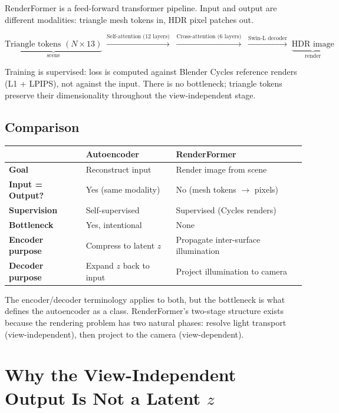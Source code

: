 \documentclass[12pt]{article}
\begin{document}
RenderFormer is a feed-forward transformer pipeline. Input and output are different modalities: triangle mesh tokens in, HDR pixel patches out.

\begin{equation}
    \underbrace{\text{Triangle tokens } (N \times 13)}_{\text{scene}} \;\xrightarrow{\text{Self-attention (12 layers)}}\; \xrightarrow{\text{Cross-attention (6 layers)}}\; \xrightarrow{\text{Swin-L decoder}}\; \underbrace{\text{HDR image}}_{\text{render}}
\end{equation}

Training is supervised: loss is computed against Blender Cycles reference renders (L1 + LPIPS), not against the input. There is no bottleneck; triangle tokens preserve their dimensionality throughout the view-independent stage.

\subsection{Comparison}

\begin{center}
\begin{tabular}{>{\bfseries}l p{4.5cm} p{5cm}}
\toprule
 & Autoencoder & RenderFormer \\
\midrule
Goal & Reconstruct input & Render image from scene \\
Input = Output? & Yes (same modality) & No (mesh tokens $\to$ pixels) \\
Supervision & Self-supervised & Supervised (Cycles renders) \\
Bottleneck & Yes, intentional & None \\
Encoder purpose & Compress to latent $z$ & Propagate inter-surface illumination \\
Decoder purpose & Expand $z$ back to input & Project illumination to camera \\
\bottomrule
\end{tabular}
\end{center}

The encoder/decoder terminology applies to both, but the bottleneck is what defines the autoencoder as a class. RenderFormer's two-stage structure exists because the rendering problem has two natural phases: resolve light transport (view-independent), then project to the camera (view-dependent).

\section{Why the View-Independent Output Is Not a Latent $z$}
\end{document}
